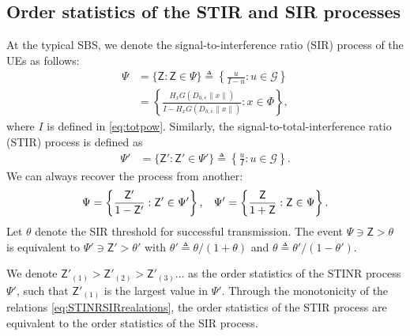 \documentclass[lettersize,journal]{IEEEtran}
\begin{document}

    
  
    \subsection{Order statistics of the STIR and SIR processes}

 At the typical SBS, we denote the signal-to-interference ratio (SIR) process of the UEs as follows:
\begin{align}
  \label{eq:SINR}
  \Psi &= \{\mathsf{Z}: \mathsf{Z} \in \Psi\} \triangleq \left\{ \frac{u}{I-u} : u \in \mathcal{G}\right\} \nonumber \\
  &=\left\{ \frac{H_x G(D_{h,\epsilon}\|x\|)}{I-H_x G(D_{h,\epsilon}\|x\|)} : x \in \Phi\right\},
\end{align}
where $I$ is defined in \eqref{eq:totpow}. Similarly, the signal-to-total-interference ratio (STIR) process is defined as
\begin{align}
  \label{eq:STINR}
  \Psi' &= \{\mathsf{Z}': \mathsf{Z}' \in \Psi'\} \triangleq \left\{ \frac{u}{I} : u \in \mathcal{G}\right\}.
\end{align}
We can always recover the process from another:
\begin{equation}
  \label{eq:STINRSIRrealations}
  \Psi = \left\{ \frac{\mathsf{Z}'}{1- \mathsf{Z}'}: \mathsf{Z}' \in \Psi' \right\}, \hspace{0.3cm} \Psi' = \left\{ \frac{\mathsf{Z}}{1+ \mathsf{Z}}: \mathsf{Z} \in \Psi \right\}.
\end{equation}
Let $\theta$ denote the SIR threshold for successful transmission. The event $\Psi \ni\mathsf{Z}> \theta$ is equivalent to $\Psi' \ni \mathsf{Z}'> \theta'$  with $\theta' \triangleq \theta/(1+\theta)$ and $\theta \triangleq \theta'/(1-\theta')$. 
    
We denote $\mathsf{Z}'_{(1)}>\mathsf{Z}'_{(2)} >\mathsf{Z}'_{(3)} \dots$ as the order statistics of the STINR process $\Psi'$, such that $\mathsf{Z}'_{(1)}$ is the largest value in $\Psi'$. Through the monotonicity of the relations \eqref{eq:STINRSIRrealations}, the order statistics of the STIR process are equivalent to the order statistics of the SIR process.
\end{document}
